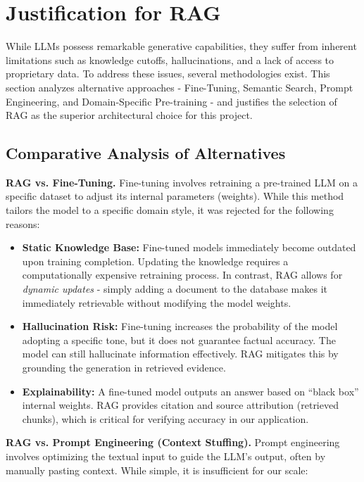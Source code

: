 \section{Justification for RAG}

While LLMs possess remarkable generative capabilities, they suffer from inherent limitations such as knowledge cutoffs, hallucinations, and a lack of access to proprietary data. To address these issues, several methodologies exist. This section analyzes alternative approaches - Fine-Tuning, Semantic Search, Prompt Engineering, and Domain-Specific Pre-training - and justifies the selection of RAG as the superior architectural choice for this project.

\subsection{Comparative Analysis of Alternatives}

\textbf{RAG vs. Fine-Tuning.}
Fine-tuning involves retraining a pre-trained LLM on a specific dataset to adjust its internal parameters (weights). While this method tailors the model to a specific domain style, it was rejected for the following reasons:

\begin{itemize}
    \item \textbf{Static Knowledge Base:} Fine-tuned models immediately become outdated upon training completion. Updating the knowledge requires a computationally expensive retraining process. In contrast, RAG allows for \textit{dynamic updates} - simply adding a document to the database makes it immediately retrievable without modifying the model weights.
    \item \textbf{Hallucination Risk:} Fine-tuning increases the probability of the model adopting a specific tone, but it does not guarantee factual accuracy. The model can still hallucinate information effectively. RAG mitigates this by grounding the generation in retrieved evidence.
    \item \textbf{Explainability:} A fine-tuned model outputs an answer based on ``black box'' internal weights. RAG provides citation and source attribution (retrieved chunks), which is critical for verifying accuracy in our application.
\end{itemize}

\textbf{RAG vs. Prompt Engineering (Context Stuffing).}
Prompt engineering involves optimizing the textual input to guide the LLM's output, often by manually pasting context. While simple, it is insufficient for our scale:

